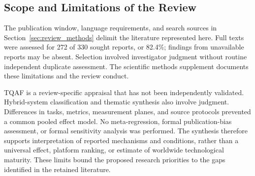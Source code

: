 \subsection{Scope and Limitations of the Review}

The publication window, language requirements, and search sources in
Section~\ref{sec:review_methods} delimit the literature represented here.
Full texts were assessed for 272 of 330 sought reports, or 82.4\%; findings
from unavailable reports may be absent. Selection involved investigator
judgment without routine independent duplicate assessment. The scientific
methods supplement documents these limitations and the review conduct.

TQAF is a review-specific appraisal that has not been independently validated.
Hybrid-system classification and thematic synthesis also involve judgment.
Differences in tasks, metrics, measurement planes, and source protocols
prevented a common pooled effect model. No meta-regression, formal
publication-bias assessment, or formal sensitivity analysis was performed.
The synthesis therefore supports interpretation of reported mechanisms and
conditions, rather than a universal effect, platform ranking, or estimate of
worldwide technological maturity. These limits bound the proposed research
priorities to the gaps identified in the retained literature.
